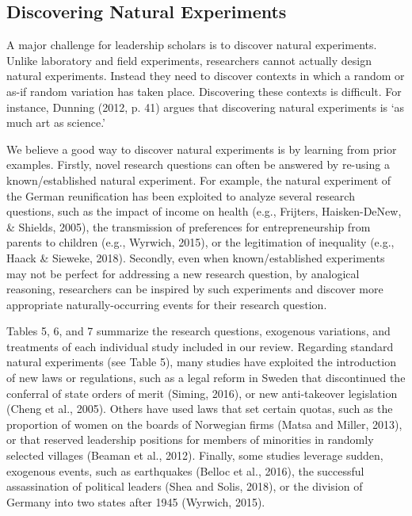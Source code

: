 \documentclass[english]{article}
\begin{document}
\subsection{Discovering Natural Experiments} 

\noindent A major challenge for leadership scholars is to discover natural
experiments. Unlike laboratory and field experiments, researchers cannot
actually design natural experiments. Instead they need to discover
contexts in which a random or as-if random variation has taken place.
Discovering these contexts is difficult. For instance, Dunning (2012, p.
41) argues that discovering natural experiments is `as much art as
science.'

We believe a good way to discover natural experiments is by learning
from prior examples. Firstly, novel research questions can often be
answered by re-using a known/established natural experiment. For
example, the natural experiment of the German reunification has been
exploited to analyze several research questions, such as the impact of
income on health (e.g., Frijters, Haisken-DeNew, \& Shields, 2005), the
transmission of preferences for entrepreneurship from parents to
children (e.g., Wyrwich, 2015), or the legitimation of inequality (e.g.,
Haack \& Sieweke, 2018). Secondly, even when known/established
experiments may not be perfect for addressing a new research question,
by analogical reasoning, researchers can be inspired by such experiments
and discover more appropriate naturally-occurring events for their
research question.

Tables 5, 6, and 7 summarize the research questions, exogenous
variations, and treatments of each individual study included in our
review. Regarding standard natural experiments (see Table 5), many
studies have exploited the introduction of new laws or regulations, such
as a legal reform in Sweden that discontinued the conferral of state
orders of merit (Siming, 2016), or new anti-takeover legislation (Cheng
et al., 2005). Others have used laws that set certain quotas, such as
the proportion of women on the boards of Norwegian firms (Matsa and
Miller, 2013), or that reserved leadership positions for members of
minorities in randomly selected villages (Beaman et al., 2012). Finally,
some studies leverage sudden, exogenous events, such as earthquakes
(Belloc et al., 2016), the successful assassination of political leaders
(Shea and Solis, 2018), or the division of Germany into two states after
1945 (Wyrwich, 2015).
\end{document}
